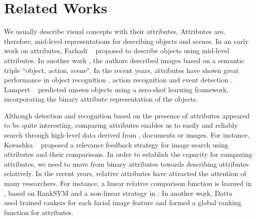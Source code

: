 \section{Related Works}
\label{sec.2}

We usually describe visual concepts with their attributes. %
Attributes are, therefore, mid-level representations for describing objects and scenes. In an early work on attributes, Farhadi \etal~\cite{Farhadi09describingobjects} proposed to describe objects using mid-level attributes. In another work \cite{Farhadi2010EveryPT}, the authors described images based on %
a semantic triple ``object, action, scene". In the recent years, attributes have shown great performance in object recognition \cite{Farhadi09describingobjects,7298613}, action recognition \cite{6838985,5995353} and event detection \cite{6475038}. Lampert \etal~\cite{6571196} predicted unseen objects using a zero-shot learning framework, incorporating the binary attribute representation of the objects. %

Although detection and recognition based on the presence of attributes appeared to be quite interesting, comparing attributes enables us to easily and reliably search through high-level data derived from \eg, documents or images. For instance, Kovashka \etal~\cite{KovashkaG13} proposed a relevance feedback strategy for image search using attributes and their comparisons. In order to establish the capacity for comparing attributes, we need to move from binary attributes towards describing attributes relatively. In the recent years, relative attributes have attracted the attention of many researchers.
For instance, a linear relative comparison function is learned in \cite{parikh2011}, based on RankSVM \cite{Joachims2002} and a non-linear strategy in \cite{Li2012RelativeFF}. In another work, Datta \etal~\cite{5771429} used trained rankers for each facial image feature and formed a global ranking function for attributes.

